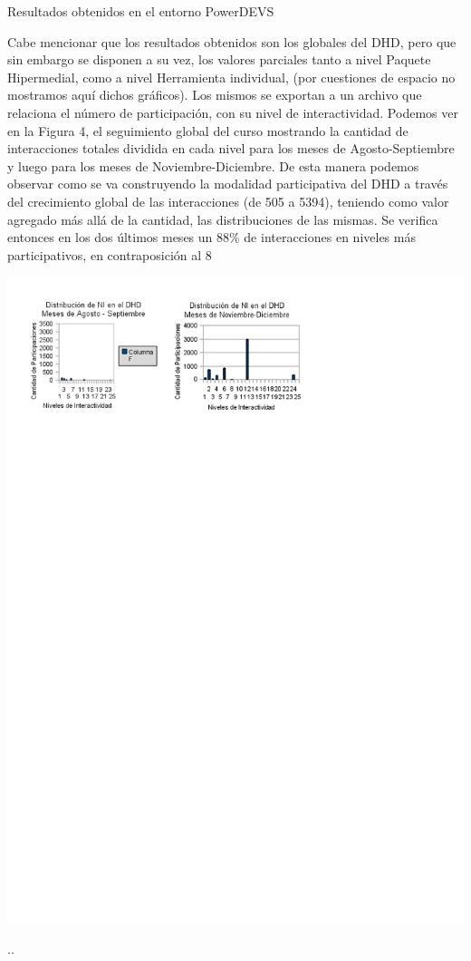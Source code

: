 \caption {Resultados obtenidos en el entorno PowerDEVS} 

Cabe mencionar que los resultados obtenidos son los globales del DHD, pero que sin embargo se disponen a su vez, los valores parciales tanto a nivel Paquete Hipermedial, como a nivel Herramienta individual, (por cuestiones de espacio no mostramos aquí dichos gráficos). Los mismos se exportan a un archivo que relaciona el número de participación, con su nivel de interactividad. Podemos ver en la Figura 4, el seguimiento global del curso mostrando la cantidad de interacciones totales dividida en cada nivel para los meses de Agosto-Septiembre y luego para los meses de Noviembre-Diciembre.
De esta manera podemos observar como se va construyendo la modalidad participativa del DHD a través del crecimiento global de las interacciones (de 505 a 5394), teniendo como valor agregado más allá de la cantidad, las distribuciones de las mismas. Se verifica entonces en los dos últimos meses un 88\% de interacciones en niveles más participativos, en contraposición al 8%

\begin{center}
 \includegraphics [scale=1] {Ch7/f6Dev}
  \caption{..}\label{}
\end{center}


